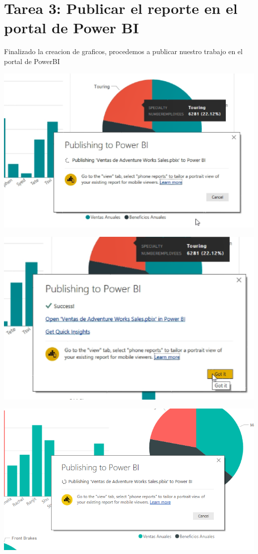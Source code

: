 \section{Tarea 3: Publicar el reporte en el portal de Power BI} 

Finalizado la creacion de graficos, procedemos a publicar nuestro trabajo en el portal de PowerBI

	\begin{center}
	\includegraphics[width=17cm]{./Imagenes/cap18}
	\end{center}	

	\begin{center}
	\includegraphics[width=17cm]{./Imagenes/cap19}
	\end{center}	
	
	\begin{center}
	\includegraphics[width=18cm]{./Imagenes/cap20}
	\end{center}